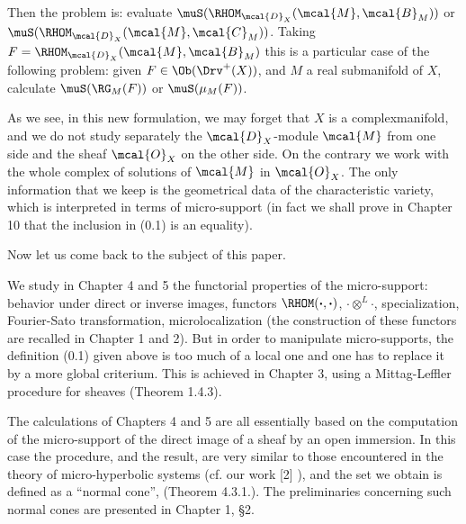 Then the problem is: evaluate 
\(\muS(\RHOM_{\mcal{D}_X}(\mcal{M},\mcal{B}_M))\) or
\(\muS(\RHOM_{\mcal{D}_X}(\mcal{M},\mcal{C}_M))\). 
Taking $F = \RHOM_{\mcal{D}_X}(\mcal{M},\mcal{B}_M)$ 
this is a particular case of the following problem: 
given $F \in \Ob(\Drv^+(X))$, and $M$ a real submanifold of $X$, 
calculate $\muS (\RG_M(F))$ or $\muS(\mu_M(F))$.

As we see, in this new formulation, we may forget that $X$ is a
complexmanifold, and we do not study separately 
the $\mcal{D}_X$-module $\mcal{M}$ from one side 
and the sheaf $\mcal{O}_X$ on the other side. 
On the contrary 
we work with the whole complex of solutions of $\mcal{M}$ in $\mcal{O}_X$. 
The only information that we keep is 
the geometrical data of the characteristic variety, 
which is interpreted in terms of micro-support (in fact
we shall prove in Chapter 10 that the inclusion in (0.1) is an
equality). 

Now let us come back to the subject of this paper.

We study in Chapter 4 and 5 
the functorial properties of the micro-support: 
behavior under direct or inverse images, functors
$\RHOM(\boldsymbol{\cdot},\boldsymbol{\cdot})$, $\boldsymbol{\cdot}\otimes^{L}\boldsymbol{\cdot}$, 
specialization, Fourier-Sato transformation, 
microlocalization (the construction of 
these functors are recalled in Chapter 1 and 2). 
But in order to manipulate micro-supports, 
the definition (0.1) given above is too much 
of a local one and one has to replace it 
by a more global criterium. 
This is achieved in Chapter 3, 
using a Mittag-Leffler procedure for sheaves (Theorem 1.4.3).

The calculations of Chapters 4 and 5 are 
all essentially based on
the computation of the micro-support of the direct image 
of a sheaf by an open immersion. 
In this case the procedure, and the result,
are very similar to those encountered in the theory 
of micro-hyperbolic systems (cf. our work [2] ), 
and the set we obtain is defined as a ``normal cone'', 
(Theorem 4.3.1.). 
The preliminaries concerning such normal cones 
are presented in Chapter 1, \S2.

